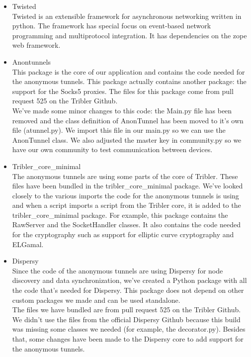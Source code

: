 \documentclass{article}
\begin{document}
\begin{itemize}
		\item Twisted\\
		Twisted is an extensible framework for asynchronous networking written in python. The framework has special focus on event-based network programming and multiprotocol integration. It has dependencies on the zope web framework.
	
		\item Anontunnels\\
		This package is the core of our application and contains the code needed for the anonymous tunnels. This package actually contains another package: the support for the Socks5 proxies. The files for this package come from pull request 525 on the Tribler Github.\\
		
		We've made some minor changes to this code: the Main.py file has been removed and the class definition of AnonTunnel has been moved to it’s own file (atunnel.py). We import this file in our main.py so we can use the AnonTunnel class. We also adjusted the master key in community.py so we have our own community to test communication between devices.
		
		\item Tribler\_core\_minimal\\
		The anonymous tunnels are using some parts of the core of Tribler. These files have been bundled in the tribler\_core\_minimal package. We’ve looked closely to the various imports the code for the anonymous tunnels is using and when a script imports a script from the Tribler core, it is added to the tribler\_core\_minimal package. For example, this package contains the RawServer and the SocketHandler classes. It also contains the code needed for the cryptography such as support for elliptic curve cryptography and ELGamal.
		
		\item Dispersy\\
		Since the code of the anonymous tunnels are using Dispersy for node discovery and data synchronization, we’ve created a Python package with all the code that’s needed for Dispersy. This package does not depend on other custom packages we made and can be used standalone.\\
		The files we have bundled are from pull request 525 on the Tribler Github. We didn’t use the files from the official Dispersy Github because this build was missing some classes we needed (for example, the decorator.py). Besides that, some changes have been made to the Dispersy core to add support for the anonymous tunnels.
	
	\end{itemize}
\end{document}
